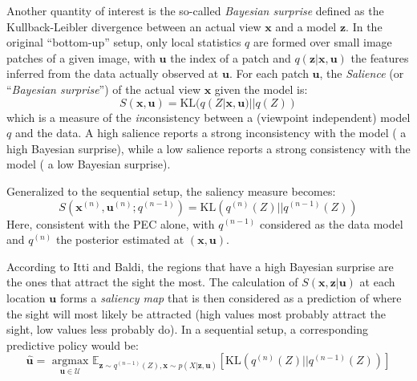 \documentclass[12pt,twoside,openright]{article}
\begin{document}



Another quantity of interest is the so-called \emph{Bayesian surprise} \cite{itti2005bayesian} defined as the Kullback-Leibler divergence {\color{blue} between an actual view $\boldsymbol{x}$ and a model $\boldsymbol{z}$}. In the original ``bottom-up'' setup, only local statistics $q$ are formed over small image patches of a given image, with $\boldsymbol{u}$ the index of a patch and $q(\boldsymbol{z}|\boldsymbol{x},\boldsymbol{u})$ the features inferred from the data actually observed at $\boldsymbol{u}$. For each patch $\boldsymbol{u}$, the \emph{Salience} (or ``\emph{Bayesian surprise}'') of the actual view $\boldsymbol{x}$ given the model is:
$$ S(\boldsymbol{x},\boldsymbol{u}) = \text{KL}(q(Z| \boldsymbol{x}, \boldsymbol{u})||q(Z))$$
which is a measure of the \emph{in}consistency between a (viewpoint independent)  model $q$ and the data. A high salience reports a strong inconsistency with the model ({\color{blue} a high Bayesian surprise}), while a low salience reports a strong consistency with the model ({\color{blue} a low Bayesian surprise}).

Generalized to the sequential setup, the saliency measure becomes:
$$ S(\boldsymbol{x}^{(n)},\boldsymbol{u}^{(n)}; q^{(n-1)}) = \text{KL}(q^{(n)}(Z)||q^{(n-1)}(Z))$$
Here, consistent with the PEC alone, 
with $q^{(n-1)}$ considered as the data model and $q^{(n)}$ the posterior estimated at $(\boldsymbol{x},\boldsymbol{u})$.

According to Itti and Baldi, the regions that have a high Bayesian surprise are the ones that attract the sight the most. The calculation of $S(\boldsymbol{x}, \boldsymbol{z}| \boldsymbol{u})$ at each location $\boldsymbol{u}$ forms a \emph{saliency map} that is then considered as a prediction of where the sight will most likely be attracted (high values most probably attract the sight, low values less probably do). 
In a sequential setup, a corresponding predictive policy would be:
$$ \hat{\boldsymbol{u}} = \underset{\boldsymbol{u} \in \mathcal{U}}{\text{ argmax }} \mathbb{E}_{\boldsymbol{z} \sim q^{(n-1)}(Z), \boldsymbol{x} \sim p(X|\boldsymbol{z}, \boldsymbol{u})}\left[\text{KL}(q^{(n)}(Z)||q^{(n-1)}(Z))\right]$$
\end{document}
